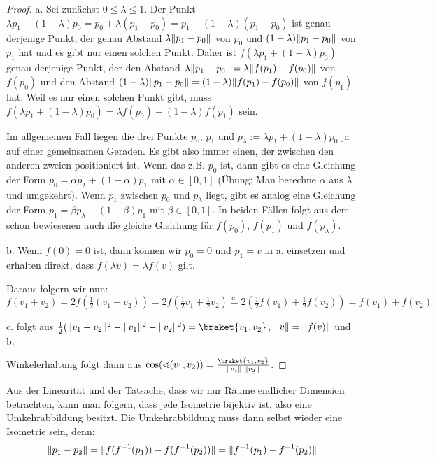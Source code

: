 \begin{proof}
a. Sei zunächst $0\leq \lambda\leq 1$. Der Punkt $\lambda p_1+(1-\lambda)p_0 = p_0+\lambda(p_1-p_0) = p_1-(1-\lambda)(p_1-p_0)$ ist genau derjenige Punkt, der genau Abstand $\lambda\lVert p_1-p_0\rVert$ von $p_0$ und $(1-\lambda)\lVert p_1-p_0\rVert$ von $p_1$ hat und es gibt nur einen solchen Punkt. Daher ist $f(\lambda p_1+(1-\lambda)p_0)$ genau derjenige Punkt, der den Abstand $\lambda\lVert p_1-p_0\rVert=\lambda\lVert f(p_1)-f(p_0)\rVert$ von $f(p_0)$ und den Abstand $(1-\lambda)\lVert p_1-p_0\rVert = (1-\lambda)\lVert f(p_1)-f(p_0)\rVert$ von $f(p_1)$ hat. Weil es nur einen solchen Punkt gibt, muss $f(\lambda p_1+(1-\lambda)p_0) = \lambda f(p_0)+(1-\lambda)f(p_1)$ sein.

Im allgemeinen Fall liegen die drei Punkte $p_0$, $p_1$ und $p_\lambda:=\lambda p_1+(1-\lambda)p_0$ ja auf einer gemeinsamen Geraden. Es gibt also immer einen, der zwischen den anderen zweien positioniert ist. Wenn das z.B. $p_0$ ist, dann gibt es eine Gleichung der Form $p_0 = \alpha p_\lambda + (1-\alpha)p_1$ mit $\alpha\in [0,1]$ (Übung: Man berechne $\alpha$ aus $\lambda$ und umgekehrt). Wenn $p_1$ zwischen $p_0$ und $p_\lambda$ liegt, gibt es analog eine Gleichung der Form $p_1=\beta p_\lambda + (1-\beta)p_1$ mit $\beta\in[0,1]$. In beiden Fällen folgt aus dem schon bewiesenen auch die gleiche Gleichung für $f(p_0)$, $f(p_1)$ und $f(p_\lambda)$.

\medbreak
b. Wenn $f(0)=0$ ist, dann können wir $p_0=0$ und $p_1=v$ in a. einsetzen und erhalten direkt, dass $f(\lambda v)=\lambda f(v)$ gilt.

Daraus folgern wir nun:
\[f(v_1+v_2) = 2f(\tfrac{1}{2}(v_1+v_2)) = 2f(\tfrac{1}{2}v_1 + \tfrac{1}{2}v_2) \overset{a.}{=} 2(\tfrac{1}{2}f(v_1)+\tfrac{1}{2}f(v_2))=f(v_1)+f(v_2)\]

\medbreak
c. folgt aus $\tfrac{1}{2}(\norm{v_1+v_2}^2-\norm{v_1}^2-\norm{v_2}^2)=\braket{v_1,v_2}$, $\lVert v\rVert=\lVert f(v)\rVert$ und b.

Winkelerhaltung folgt dann aus $\cos(\sphericalangle(v_1,v_2)) = \frac{\braket{v_1,v_2}}{\norm{v_1}\cdot\norm{v_2}}$.
\end{proof}

\begin{remark}
Aus der Linearität und der Tatsache, dass wir nur Räume endlicher Dimension betrachten, kann man folgern, dass jede Isometrie bijektiv ist, also eine Umkehrabbildung besitzt. Die Umkehrabbildung muss dann selbst wieder eine Isometrie sein, denn:
\[\lVert p_1-p_2\rVert = \lVert f(f^{-1}(p_1))-f(f^{-1}(p_2))\rVert = \lVert f^{-1}(p_1)-f^{-1}(p_2)\rVert\]
\end{remark}

